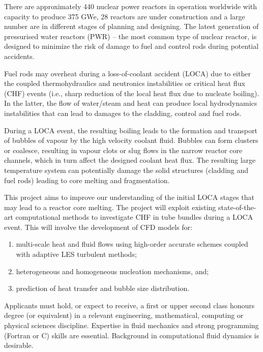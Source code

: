 \documentclass[14pt,twoside]{report}
\begin{document}
  There are approximately 440 nuclear power reactors in operation worldwide with capacity to produce 375 GWe, 28 reactors are under construction and a large number are in different stages of planning and designing. The latest generation of pressurised water reactors (PWR) -- the most common type of nuclear reactor, is designed to minimize the risk of damage to fuel and control rods during potential accidents.

  Fuel rods may overheat during a loss-of-coolant accident (LOCA) due to either the coupled thermohydraulics and neutronics instabilities or critical heat flux (CHF) events (i.e., sharp reduction of the local heat flux due to nucleate boiling). In the latter, the flow of water/steam and heat can produce local hydrodynamics instabilities that can lead to damages to the cladding, control and fuel rods.

  During a LOCA event, the resulting boiling leads to the formation and transport of bubbles of vapour by the high velocity coolant fluid. Bubbles can form clusters or coalesce, resulting in vapour clots or slug flows in the narrow reactor core channels, which in turn affect the designed coolant heat flux. The resulting large temperature system can potentially damage the solid structures (cladding and fuel rods) leading to core melting and fragmentation.
  
  This project aims to improve our understanding of the initial LOCA stages that may lead to a reactor core melting. The project will exploit existing state-of-the-art computational methods to investigate CHF in tube bundles during a LOCA event. This will involve the development of CFD models for:
  \begin{enumerate}%
    \item multi-scale heat and fluid flows using high-order accurate schemes coupled with adaptive LES turbulent methods;
    \item heterogeneous and homogeneous nucleation mechanisms, and;
    \item prediction of heat transfer and bubble size distribution.
  \end{enumerate}
  
  Applicants must hold, or expect to receive, a first or upper second class honours degree (or equivalent) in a relevant engineering, mathematical, computing or physical sciences discipline. Expertise in fluid mechanics and strong programming (Fortran or C) skills are essential. Background in computational fluid dynamics is desirable.
  
\end{document}
